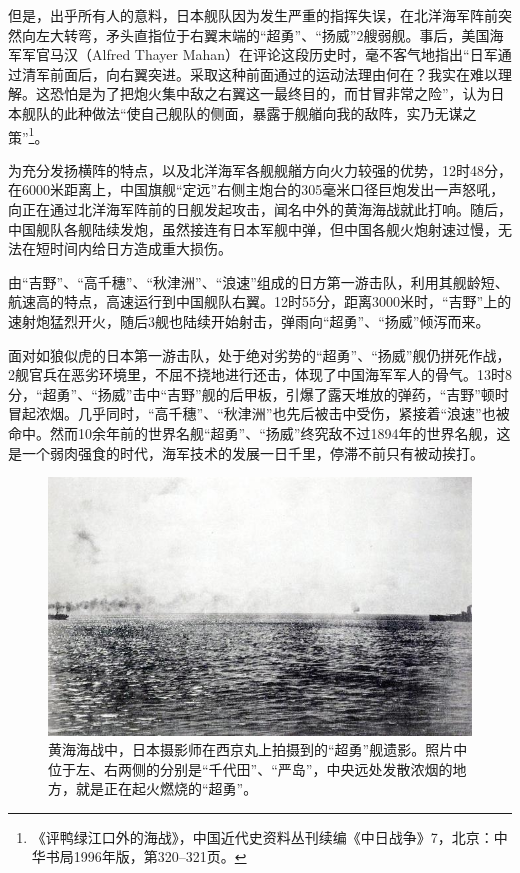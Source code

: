 \documentclass[12pt,UTF8]{ctexbook}
\begin{document}
但是，出乎所有人的意料，日本舰队因为发生严重的指挥失误，在北洋海军阵前突然向左大转弯，矛头直指位于右翼末端的“超勇”、“扬威”2艘弱舰。事后，美国海军军官马汉（Alfred Thayer Mahan）在评论这段历史时，毫不客气地指出“日军通过清军前面后，向右翼突进。采取这种前面通过的运动法理由何在？我实在难以理解。这恐怕是为了把炮火集中敌之右翼这一最终目的，而甘冒非常之险”，认为日本舰队的此种做法“使自己舰队的侧面，暴露于舰艏向我的敌阵，实乃无谋之策”\footnote{《评鸭绿江口外的海战》，中国近代史资料丛刊续编《中日战争》7，北京：中华书局1996年版，第320--321页。}。

为充分发扬横阵的特点，以及北洋海军各舰舰艏方向火力较强的优势，12时48分，在6000米距离上，中国旗舰“定远”右侧主炮台的305毫米口径巨炮发出一声怒吼，向正在通过北洋海军阵前的日舰发起攻击，闻名中外的黄海海战就此打响。随后，中国舰队各舰陆续发炮，虽然接连有日本军舰中弹，但中国各舰火炮射速过慢，无法在短时间内给日方造成重大损伤。

由“吉野”、“高千穗”、“秋津洲”、“浪速”组成的日方第一游击队，利用其舰龄短、航速高的特点，高速运行到中国舰队右翼。12时55分，距离3000米时，“吉野”上的速射炮猛烈开火，随后3舰也陆续开始射击，弹雨向“超勇”、“扬威”倾泻而来。

面对如狼似虎的日本第一游击队，处于绝对劣势的“超勇”、“扬威”舰仍拼死作战，2舰官兵在恶劣环境里，不屈不挠地进行还击，体现了中国海军军人的骨气。13时8分，“超勇”、“扬威”击中“吉野”舰的后甲板，引爆了露天堆放的弹药，“吉野”顿时冒起浓烟。几乎同时，“高千穗”、“秋津洲”也先后被击中受伤，紧接着“浪速”也被命中。然而10余年前的世界名舰“超勇”、“扬威”终究敌不过1894年的世界名舰，这是一个弱肉强食的时代，海军技术的发展一日千里，停滞不前只有被动挨打。

\begin{figure}[htbp]
	\centering
	\includegraphics[width=1\linewidth]{Images/39}
	\caption{黄海海战中，日本摄影师在西京丸上拍摄到的“超勇”舰遗影。照片中位于左、右两侧的分别是“千代田”、“严岛”，中央远处发散浓烟的地方，就是正在起火燃烧的“超勇”。}
	\label{fig:1}
\end{figure}
\end{document}

